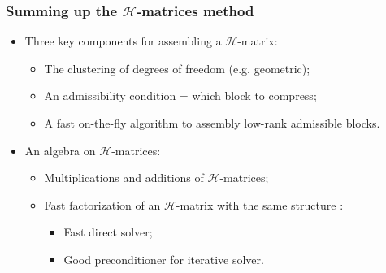 \begin{frame}
\frametitle{Summing up the $\mathcal{H}$-matrices method}
\begin{itemize}
\item Three key components for assembling a $\mathcal{H}$-matrix: 
\begin{itemize}
  \item The clustering of degrees of freedom (e.g. geometric);
  \item An admissibility condition = which block to compress;
  \item A fast on-the-fly algorithm to assembly low-rank admissible blocks.
\end{itemize}
\item An algebra on $\mathcal{H}$-matrices: 
\begin{itemize}
\item Multiplications and additions of $\mathcal{H}$-matrices;
\item Fast factorization of an $\mathcal{H}$-matrix with the same structure :
\begin{itemize}
\item Fast direct solver;
\item Good preconditioner for iterative solver.
\end{itemize}
\end{itemize}
\end{itemize}
\end{frame}

